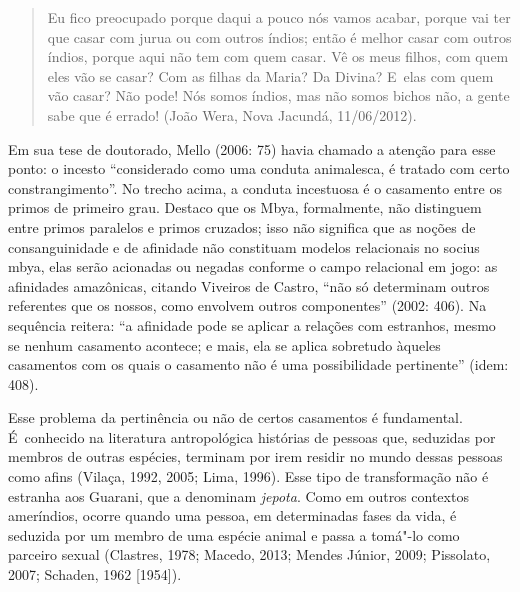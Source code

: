 \begin{quote}
Eu fico preocupado porque daqui a pouco nós vamos acabar, porque vai ter
que casar com jurua ou com outros índios; então é melhor casar com
outros índios, porque aqui não tem com quem casar. Vê os meus filhos,
com quem eles vão se casar? Com as filhas da Maria? Da Divina? E~elas
com quem vão casar? Não pode! Nós somos índios, mas não somos bichos
não, a gente sabe que é errado! (João Wera, Nova Jacundá, 11/06/2012).
\end{quote}

Em sua tese de doutorado, Mello (2006: 75) havia chamado a atenção para
esse ponto: o incesto ``considerado como uma conduta animalesca, é
tratado com certo constrangimento''. No trecho acima, a conduta
incestuosa é o casamento entre os primos de primeiro grau. Destaco que
os Mbya, formalmente, não distinguem entre primos paralelos e primos
cruzados; isso não significa que as noções de consanguinidade e de
afinidade não constituam modelos relacionais no socius mbya, elas serão
acionadas ou negadas conforme o campo relacional em jogo: as afinidades
amazônicas, citando Viveiros de Castro, ``não só determinam outros
referentes que os nossos, como envolvem outros componentes'' (2002: 406).
Na sequência reitera: ``a afinidade pode se aplicar a relações com
estranhos, mesmo se nenhum casamento acontece; e mais, ela se aplica
sobretudo àqueles casamentos com os quais o casamento não é uma
possibilidade pertinente'' (idem: 408).

Esse problema da pertinência ou não de certos casamentos é fundamental.
É~conhecido na literatura antropológica histórias de pessoas que,
seduzidas por membros de outras espécies, terminam por irem residir no
mundo dessas pessoas como afins (Vilaça, 1992, 2005; Lima, 1996). Esse
tipo de transformação não é estranha aos Guarani, que a denominam
\emph{jepota}. Como em outros contextos ameríndios, ocorre quando uma pessoa,
em determinadas fases da vida, é seduzida por um membro de uma espécie
animal e passa a tomá"-lo como parceiro sexual (Clastres, 1978; Macedo,
2013; Mendes Júnior, 2009; Pissolato, 2007; Schaden, 1962 [1954]).

